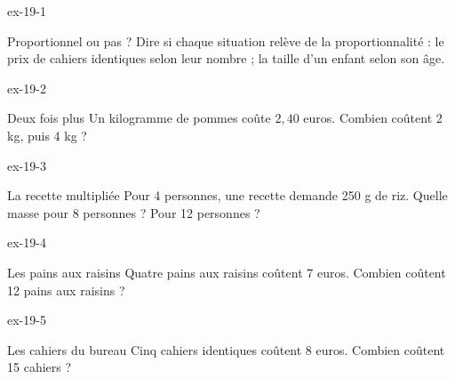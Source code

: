 \clearpage{}
\begin{blocLivre}{ex-19-1}\begin{exercice}[1]{Proportionnel ou pas ?}
Dire si chaque situation relève de la proportionnalité : le prix de cahiers identiques selon leur nombre ; la taille d’un enfant selon son âge.
\end{exercice}\end{blocLivre}
\begin{blocLivre}{ex-19-2}\begin{exercice}[1]{Deux fois plus}
Un kilogramme de pommes coûte $2{,}40$ euros. Combien coûtent 2 kg, puis 4 kg ?
\end{exercice}\end{blocLivre}
\begin{blocLivre}{ex-19-3}\begin{exercice}[1]{La recette multipliée}
Pour 4 personnes, une recette demande 250 g de riz. Quelle masse pour 8 personnes ? Pour 12 personnes ?
\end{exercice}\end{blocLivre}
\begin{blocLivre}{ex-19-4}\begin{exercice}[1]{Les pains aux raisins}
Quatre pains aux raisins coûtent 7 euros. Combien coûtent 12 pains aux raisins ?
\end{exercice}\end{blocLivre}
\begin{blocLivre}{ex-19-5}\begin{exercice}[1]{Les cahiers du bureau}
Cinq cahiers identiques coûtent 8 euros. Combien coûtent 15 cahiers ?
\end{exercice}\end{blocLivre}

